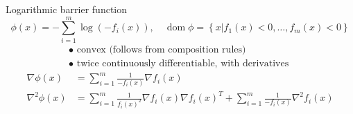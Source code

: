 \documentclass{beamer}
\begin{document}
\begin{frame}[noframenumbering]{Logarithmic barrier function}
	\begin{equation*}
	\phi(x)=-\sum_{i=1}^{m} \log \left(-f_{i}(x)\right), \quad \operatorname{dom} \phi=\left\{x | f_{1}(x)<0, \ldots, f_{m}(x)<0\right\}
	\end{equation*}
	\begin{equation*}
	\begin{array}{l}{\bullet \text { convex (follows from composition rules) }} \\ {\bullet \text { twice continuously differentiable, with derivatives }}\end{array}
	\end{equation*}
	\begin{equation*}
	\begin{aligned} \nabla \phi(x) &=\sum_{i=1}^{m} \frac{1}{-f_{i}(x)} \nabla f_{i}(x) \\ \nabla^{2} \phi(x) &=\sum_{i=1}^{m} \frac{1}{f_{i}(x)^{2}} \nabla f_{i}(x) \nabla f_{i}(x)^{T}+\sum_{i=1}^{m} \frac{1}{-f_{i}(x)} \nabla^{2} f_{i}(x) \end{aligned}
	\end{equation*}
\end{frame}
\end{document}
